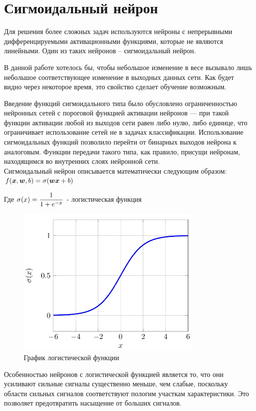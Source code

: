 \section{Сигмоидальный нейрон}

Для решения более сложных задач используются нейроны с непрерывными дифференцируемыми активационными функциями, которые не являются линейными. Один из таких нейронов – сигмоидальный нейрон.

В данной работе хотелось бы, чтобы небольшое изменение в весе вызывало лишь небольшое соответствующее изменение в выходных данных сети. Как будет видно через некоторое время, это свойство сделает обучение возможным. 

Введение функций сигмоидального типа было обусловлено ограниченностью нейронных сетей с пороговой функцией активации нейронов — при такой функции активации любой из выходов сети равен либо нулю, либо единице, что ограничивает использование сетей не в задачах классификации. Использование сигмоидальных функций позволило перейти от бинарных выходов нейрона к аналоговым. Функции передачи такого типа, как правило, 
присущи нейронам, находящимся во внутренних слоях нейронной сети. \\

Сигмоидальный нейрон описывается математически следующим образом: \\

$
  f( \boldsymbol{x}, \boldsymbol{w}, b) = \sigma(\boldsymbol{wx} + b) \\
$

Где $ \mathlarger{\sigma(x) = \frac{1}{1 + e^{-x}}}$  - логистическая функция

\begin{figure}[H]
  \centering
  \includegraphics[width=0.5\linewidth]{./img/sigma-func}
  \caption{График логистической функции}
  \label{fig:mpr}
\end{figure} 

Особенностью нейронов с логистической функцией является то, что они усиливают сильные сигналы существенно меньше, чем слабые, поскольку области сильных сигналов соответствуют пологим участкам характеристики. Это позволяет предотвратить насыщение от больших сигналов.

